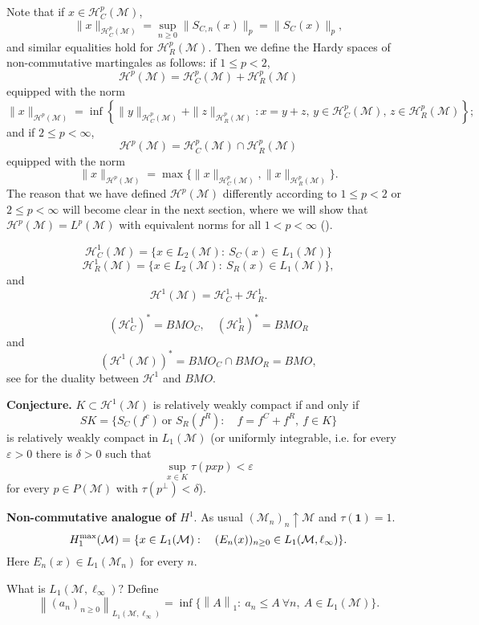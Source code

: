 \documentclass[reqno]{amsart}
\newcommand{\norm}[1]{\left\lVert#1\right\rVert}
\numberwithin{equation}{section}
\begin{document}
Note that if $x \in \mathcal{H}^p_C(\mathcal{M})$,
\[
\|x\|_{\mathcal{H}^p_C(\mathcal{M})} = \sup_{n \geq 0} \|S_{C,n}(x)\|_p = \|S_C(x)\|_p,
\]
and similar equalities hold for $\mathcal{H}^p_R(\mathcal{M})$. Then we define the Hardy spaces of non-commutative martingales as follows: if $1 \leq p < 2$,
\[
\mathcal{H}^p(\mathcal{M}) = \mathcal{H}^p_C(\mathcal{M}) + \mathcal{H}^p_R(\mathcal{M})
\]
equipped with the norm
\[
\|x\|_{\mathcal{H}^p(\mathcal{M})} = \inf \left\{ \|y\|_{\mathcal{H}^p_C(\mathcal{M})} + \|z\|_{\mathcal{H}^p_R(\mathcal{M})} : x = y + z, \, y \in \mathcal{H}^p_C(\mathcal{M}), \, z \in \mathcal{H}^p_R(\mathcal{M}) \right\};
\]
and if $2 \leq p < \infty$,
\[
\mathcal{H}^p(\mathcal{M}) = \mathcal{H}^p_C(\mathcal{M}) \cap \mathcal{H}^p_R(\mathcal{M})
\]
equipped with the norm
\[
\|x\|_{\mathcal{H}^p(\mathcal{M})} = \max\{\|x\|_{\mathcal{H}^p_C(\mathcal{M})}, \|x\|_{\mathcal{H}^p_R(\mathcal{M})}\}.
\]
The reason that we have defined $\mathcal{H}^p(\mathcal{M})$ differently according to $1 \leq p < 2$ or $2 \leq p < \infty$ will become clear in the next section, where we will show that $\mathcal{H}^p(\mathcal{M}) = L^p(\mathcal{M})$ with equivalent norms for all $1 < p < \infty$ (\cite{PX93}).

$$\mathcal{H}^1_C(\mathcal{M})=\{x\in L_2(\mathcal{M}): \ S_C(x)\in L_1(\mathcal{M})\}$$
$$\mathcal{H}^1_R(\mathcal{M})=\{x\in L_2(\mathcal{M}): \ S_R(x)\in L_1(\mathcal{M})\},$$
and 
$$\mathcal{H}^1(\mathcal{M})=\mathcal{H}^1_C+\mathcal{H}^1_R.$$

$$(\mathcal{H}^1_C)^*=BMO_C, \quad (\mathcal{H}^1_R)^*=BMO_R$$
and
$$(\mathcal{H}^1(\mathcal{M}))^*=BMO_C \cap BMO_R = BMO,$$
see \cite[Appendix]{PX93} for the duality between $\mathcal{H}^1$ and $BMO.$

{\bf Conjecture.} $K\subset \mathcal{H}^1(\mathcal{M})$ is relatively weakly compact if and only if 
$$SK=\{S_C(f^c) \ \text{or } S_R(f^R): \quad f=f^C+f^R, \ f\in K\}$$
is relatively weakly compact in $L_1(\mathcal{M})$ (or uniformly integrable, i.e. for every $\varepsilon>0$ there is $\delta>0$ such that 
$$\sup_{x\in K}\tau(pxp)<\varepsilon$$
for every $p\in P(\mathcal{M})$ with $\tau(p^\perp)<\delta$).

{\bf Non-commutative analogue of $H^1.$} As usual $(\mathcal{M}_n)_n \uparrow \mathcal{M}$ and $\tau(\mathbf{1})=1.$
$$H_1^{\rm max}(\mathcal{M}) =\{x\in L_1(\mathcal{M}): \quad (E_n(x))_{n\ge0} \in L_1(\mathcal{M}, \ell_\infty) \}.$$
Here $E_n(x)\in L_1(\mathcal{M}_n)$ for every $n.$

What is $L_1(\mathcal{M}, \ell_\infty)?$ Define
$$\norm{(a_n)_{n\ge0}}_{L_1(\mathcal{M}, \ell_\infty)}=\inf \{ \norm{A}_1: \ a_n \le A \ \forall n, \ A\in L_1(\mathcal{M}) \}.$$
\end{document}
